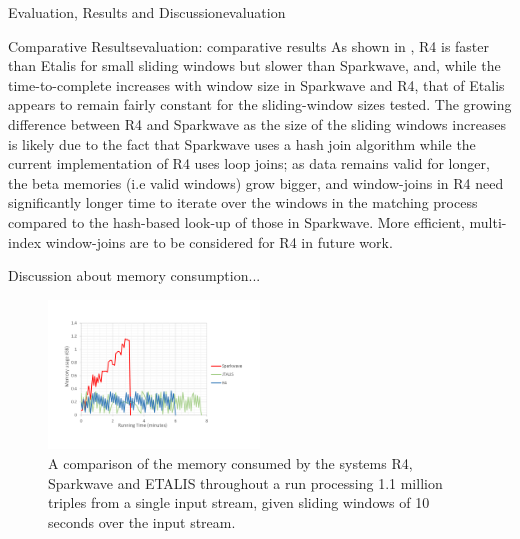 \begin{nestedsection}{Evaluation, Results and Discussion}{evaluation}
\begin{nestedsection}{Comparative Results}{evaluation: comparative results}
		As shown in , R4 is faster than Etalis for small sliding windows but slower than Sparkwave, and, while the time-to-complete increases with window size in Sparkwave and R4, that of Etalis appears to remain fairly constant for the sliding-window sizes tested.
		The growing difference between R4 and Sparkwave as the size of the sliding windows increases is likely due to the fact that Sparkwave uses a hash join algorithm while the current implementation of R4 uses loop joins;
		as data remains valid for longer, the beta memories (i.e valid windows) grow bigger, and window-joins in R4 need significantly longer time to iterate over the windows in the matching process compared to the hash-based look-up of those in Sparkwave.
		More efficient, multi-index window-joins are to be considered for R4 in future work.

		Discussion about memory consumption...
		\begin{figure}
			\centering
			\includegraphics[width=0.5\textwidth]{memoryConsumptionComparison}
			\caption{A comparison of the memory consumed by the systems R4, Sparkwave and ETALIS throughout a run processing 1.1 million triples from a single input stream, given sliding windows of 10 seconds over the input stream.}
		\end{figure}
	\end{nestedsection}

\end{nestedsection}
